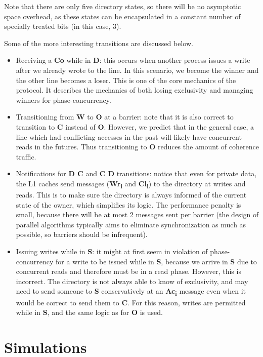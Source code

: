 \documentclass{article}
\begin{document}
Note that there are only five directory states, so there will be no asymptotic space overhead, as these states can be encapsulated in a constant number of specially treated bits (in this case, 3).

Some of the more interesting transitions are discussed below.
\begin{itemize}
  \item Receiving a \textbf{Co} while in \textbf{D}: this occurs when another
  process issues a write after we already wrote to the line. In this scenario,
  we become the winner and the other line becomes a loser. This is one of the
  core mechanics of the protocol. It describes the mechanics of both losing
  exclusivity and managing winners for phase-concurrency.
  \item Transitioning from \textbf{W} to \textbf{O} at a barrier: note that it
  is also correct to transition to \textbf{C} instead of \textbf{O}. However,
  we predict that in the general case, a line which had conflicting accesses in
  the past will likely have concurrent reads in the futures. Thus transitioning
  to \textbf{O} reduces the amount of coherence traffic.
  \item Notifications for \textbf{D \textrightarrow{} C} and
  \textbf{C \textrightarrow{} D} transitions: notice that even for private data,
  the L1 caches send messages (\textbf{Wr\textsubscript{i}} and \textbf{Cl\textsubscript{i}})
  to the directory at writes and reads. This is to
  make sure the directory is always informed of the current state of the owner,
  which simplifies its logic. The performance penalty is small, because there
  will be at most 2 messages sent per barrier (the design of parallel
  algorithms typically aims to eliminate synchronization as much as possible,
  so barriers should be infrequent).
  \item Issuing writes while in \textbf{S}: it might at first seem in violation
  of phase-concurrency for a write to be issued while in \textbf{S}, because we
  arrive in \textbf{S} due to concurrent reads and therefore must be in a
  read phase. However, this is incorrect. The directory is not always able to
  know of exclusivity, and may need to send someone to \textbf{S} conservatively
  at an \textbf{Ac\textsubscript{i}} message even when it would be correct to
  send them to \textbf{C}. For this reason, writes are permitted while in
  \textbf{S}, and the same logic as for \textbf{O} is used.
\end{itemize}

\section{Simulations}
\end{document}
